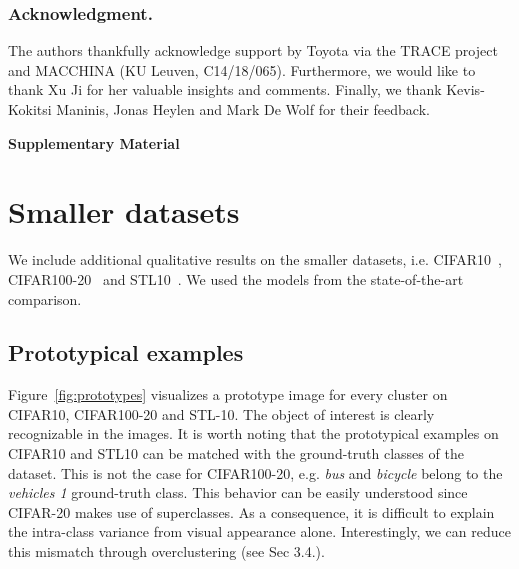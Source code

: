 \documentclass[runningheads]{llncs}
\begin{document}
\subsubsection{Acknowledgment.}
The authors thankfully acknowledge support by Toyota via the TRACE project and MACCHINA (KU Leuven, C14/18/065). Furthermore, we would like to thank Xu Ji for her valuable insights and comments. Finally, we thank Kevis-Kokitsi Maninis, Jonas Heylen and Mark De Wolf for their feedback.
 



\newpage

\begin{center}
\Large{\textbf{Supplementary Material}}
\end{center}

\setcounter{section}{0}
\renewcommand\thesection{\Alph{section}}
\setcounter{figure}{0}
\setcounter{table}{0}
\renewcommand{\thefigure}{S\arabic{figure}}
\renewcommand{\thetable}{S\arabic{table}}

\section{Smaller datasets}
\label{sec:results}
We include additional qualitative results on the smaller datasets, i.e. CIFAR10~\cite{CIFAR}, CIFAR100-20~\cite{CIFAR} and STL10~\cite{STL}. We used the models from the state-of-the-art comparison. 

\subsection{Prototypical examples}
Figure~\ref{fig:prototypes} visualizes a prototype image for every cluster on CIFAR10, CIFAR100-20 and STL-10. The object of interest is clearly recognizable in the images. It is worth noting that the prototypical examples on CIFAR10 and STL10 can be matched with the ground-truth classes of the dataset. This is not the case for CIFAR100-20, e.g. \textit{bus} and \textit{bicycle} belong to the \textit{vehicles 1} ground-truth class. This behavior can be easily understood since CIFAR-20 makes use of superclasses. As a consequence, it is difficult to explain the intra-class variance from visual appearance alone. Interestingly, we can reduce this mismatch through overclustering (see Sec 3.4.). 
\end{document}
